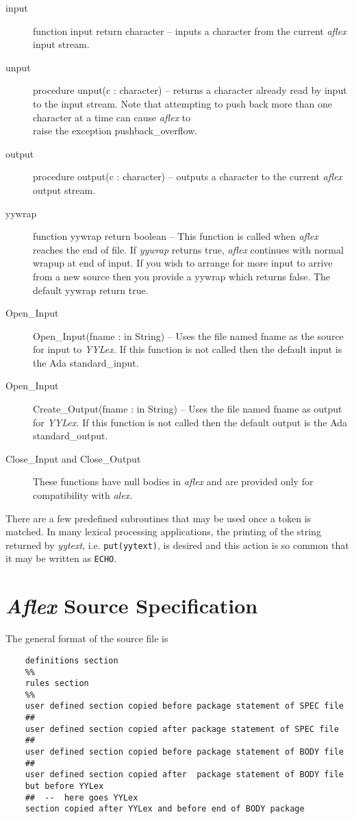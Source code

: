 \begin{description}
\item[input] function input return character -- inputs a character from the
current {\sl aflex} input stream.
\item[unput] procedure unput(c : character) -- returns a character
already read by input to the input stream.  Note that attempting to
push back more than one character at a time can cause {\sl aflex} to\\
raise the exception {\sc pushback\_overflow.}
\item[output] procedure output(c : character) -- outputs a character to the
current {\sl aflex} output stream.
\item[yywrap] function yywrap return boolean -- This function is
called when {\sl aflex} reaches the end of file.  If {\it yywrap}
returns true, {\sl aflex} continues with normal wrapup at end of
input.  If you wish to arrange for more input to arrive from a new
source then you provide a yywrap which returns false.  The default
yywrap return true.
\item[Open\_Input] Open\_Input(fname : in String) -- Uses the file named
fname as the source for input to {\it YYLex.}  If this function is not
called then the default input is the Ada {\sc standard\_input.}
\item[Open\_Input] Create\_Output(fname : in String) -- Uses the file named
fname as output for {\it YYLex.}  If this function is not
called then the default output is the Ada {\sc standard\_output}.
\item[Close\_Input and Close\_Output]  These functions have null
bodies in {\sl aflex} and are provided only for compatibility with
{\sl alex.}
\end{description}

\mysk
There are a few predefined subroutines that may be used once a token
is matched.  In many lexical processing applications, the printing of
the string returned by {\sl yytext}, i.e. {\tt put(yytext)}, is desired 
and this action is so common that it may be written as {\tt ECHO}.

\newpage
\section{{\sl Aflex} Source Specification}
\label {specformat}

The general format of the source file is

\small
\begin{verbatim}
    definitions section
    %% 
    rules section
    %% 
    user defined section copied before package statement of SPEC file
    ##
    user defined section copied after package statement of SPEC file
    ##
    user defined section copied before package statement of BODY file
    ##
    user defined section copied after  package statement of BODY file
    but before YYLex
    ##  --  here goes YYLex
    section copied after YYLex and before end of BODY package 
\end{verbatim}
\normalsize

